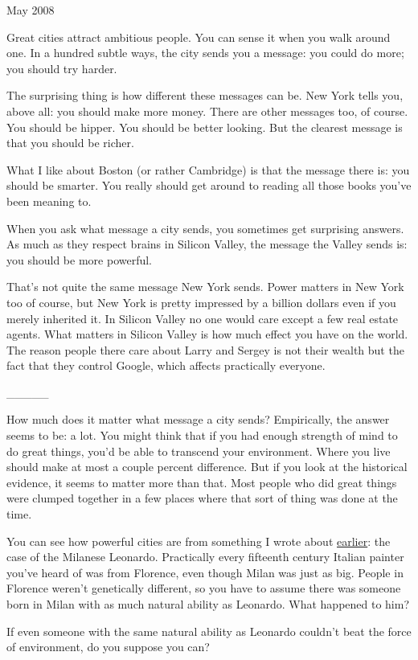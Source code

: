 May 2008

Great cities attract ambitious people. You can sense it when you walk
around one. In a hundred subtle ways, the city sends you a message: you
could do more; you should try harder.

The surprising thing is how different these messages can be. New York
tells you, above all: you should make more money. There are other
messages too, of course. You should be hipper. You should be better
looking. But the clearest message is that you should be richer.

What I like about Boston (or rather Cambridge) is that the message there
is: you should be smarter. You really should get around to reading all
those books you've been meaning to.

When you ask what message a city sends, you sometimes get surprising
answers. As much as they respect brains in Silicon Valley, the message
the Valley sends is: you should be more powerful.

That's not quite the same message New York sends. Power matters in New
York too of course, but New York is pretty impressed by a billion
dollars even if you merely inherited it. In Silicon Valley no one would
care except a few real estate agents. What matters in Silicon Valley is
how much effect you have on the world. The reason people there care
about Larry and Sergey is not their wealth but the fact that they
control Google, which affects practically everyone.

\_\_\_\_\_

How much does it matter what message a city sends? Empirically, the
answer seems to be: a lot. You might think that if you had enough
strength of mind to do great things, you'd be able to transcend your
environment. Where you live should make at most a couple percent
difference. But if you look at the historical evidence, it seems to
matter more than that. Most people who did great things were clumped
together in a few places where that sort of thing was done at the time.

You can see how powerful cities are from something I wrote about
\href{taste.html}{earlier}: the case of the Milanese Leonardo.
Practically every fifteenth century Italian painter you've heard of was
from Florence, even though Milan was just as big. People in Florence
weren't genetically different, so you have to assume there was someone
born in Milan with as much natural ability as Leonardo. What happened to
him?

If even someone with the same natural ability as Leonardo couldn't beat
the force of environment, do you suppose you can?

